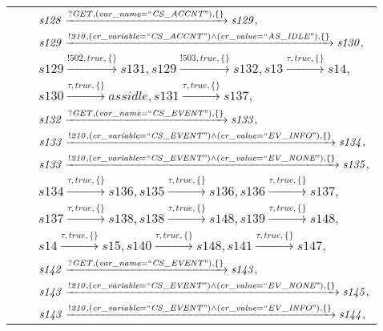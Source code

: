\begin{tabular}{lcp{350px}}
& & $\mathit{s128}\xrightarrow{\mathit{?GET}, \mathit{(var\_name = ``CS\_ACCNT")}, \{\}}\mathit{s129},$ \\
& & $\mathit{s129}\xrightarrow{\mathit{!210}, \mathit{(cr\_variable = ``CS\_ACCNT") \land (cr\_value = ``AS\_IDLE")}, \{\}}\mathit{s130},$ \\
& & $\mathit{s129}\xrightarrow{\mathit{!502}, \mathit{true}, \{\}}\mathit{s131},\mathit{s129}\xrightarrow{\mathit{!503}, \mathit{true}, \{\}}\mathit{s132},\mathit{s13}\xrightarrow{\mathit{\tau}, \mathit{true}, \{\}}\mathit{s14},$ \\
& & $\mathit{s130}\xrightarrow{\mathit{\tau}, \mathit{true}, \{\}}\mathit{assidle},\mathit{s131}\xrightarrow{\mathit{\tau}, \mathit{true}, \{\}}\mathit{s137},$ \\
& & $\mathit{s132}\xrightarrow{\mathit{?GET}, \mathit{(var\_name = ``CS\_EVENT")}, \{\}}\mathit{s133},$ \\
& & $\mathit{s133}\xrightarrow{\mathit{!210}, \mathit{(cr\_variable = ``CS\_EVENT") \land (cr\_value = ``EV\_INFO")}, \{\}}\mathit{s134},$ \\
& & $\mathit{s133}\xrightarrow{\mathit{!210}, \mathit{(cr\_variable = ``CS\_EVENT") \land (cr\_value = ``EV\_NONE")}, \{\}}\mathit{s135},$ \\
& & $\mathit{s134}\xrightarrow{\mathit{\tau}, \mathit{true}, \{\}}\mathit{s136},\mathit{s135}\xrightarrow{\mathit{\tau}, \mathit{true}, \{\}}\mathit{s136},\mathit{s136}\xrightarrow{\mathit{\tau}, \mathit{true}, \{\}}\mathit{s137},$ \\
& & $\mathit{s137}\xrightarrow{\mathit{\tau}, \mathit{true}, \{\}}\mathit{s138},\mathit{s138}\xrightarrow{\mathit{\tau}, \mathit{true}, \{\}}\mathit{s148},\mathit{s139}\xrightarrow{\mathit{\tau}, \mathit{true}, \{\}}\mathit{s148},$ \\
& & $\mathit{s14}\xrightarrow{\mathit{\tau}, \mathit{true}, \{\}}\mathit{s15},\mathit{s140}\xrightarrow{\mathit{\tau}, \mathit{true}, \{\}}\mathit{s148},\mathit{s141}\xrightarrow{\mathit{\tau}, \mathit{true}, \{\}}\mathit{s147},$ \\
& & $\mathit{s142}\xrightarrow{\mathit{?GET}, \mathit{(var\_name = ``CS\_EVENT")}, \{\}}\mathit{s143},$ \\
& & $\mathit{s143}\xrightarrow{\mathit{!210}, \mathit{(cr\_variable = ``CS\_EVENT") \land (cr\_value = ``EV\_NONE")}, \{\}}\mathit{s145},$ \\
& & $\mathit{s143}\xrightarrow{\mathit{!210}, \mathit{(cr\_variable = ``CS\_EVENT") \land (cr\_value = ``EV\_INFO")}, \{\}}\mathit{s144},$ \\

\end{tabular}
